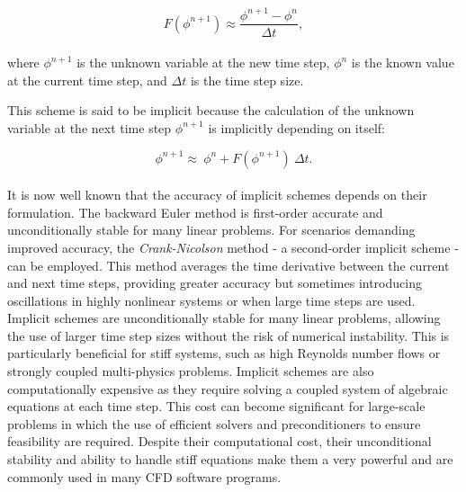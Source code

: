 \documentclass[a5paper]{sapthesis}
\begin{document}
	\begin{equation}
		F(\phi^{n+1}) \approx \dfrac{\phi^{n+1} - \phi^n}{\Delta t},
	\end{equation}
	\\
	where $\phi^{n+1}$ is the unknown variable at the new time step, $\phi^n$ is the known value at the current time step, and $\Delta t$ is the time step size.
	
	This scheme is said to be implicit because the calculation of the unknown variable at the next time step $\phi^{n+1}$ is implicitly depending on itself:
	
	\begin{equation}
		\phi^{n+1} \approx \ \phi^n + F(\phi^{n+1}) \ \Delta t.
	\label{backwardEuler1}
	\end{equation}
	\\
	It is now well known that the accuracy of implicit schemes depends on their formulation. The backward Euler method is first-order accurate and unconditionally stable for many linear problems. For scenarios demanding improved accuracy, the \textit{Crank-Nicolson}\citep{crank1947practical} method - a second-order implicit scheme - can be employed. This method averages the time derivative between the current and next time steps, providing greater accuracy but sometimes introducing oscillations in highly nonlinear systems or when large time steps are used. 
	Implicit schemes are unconditionally stable for many linear problems, allowing the use of larger time step sizes without the risk of numerical instability. This is particularly beneficial for stiff systems, such as high Reynolds number flows or strongly coupled multi-physics problems.
	Implicit schemes are also computationally expensive as they require solving a coupled system of algebraic equations at each time step. This cost can become significant for large-scale problems in which the use of efficient solvers and preconditioners to ensure feasibility are required.
	Despite their computational cost, their unconditional stability and ability to handle stiff equations make them a very powerful and are commonly used in many CFD software programs.
	
\end{document}
